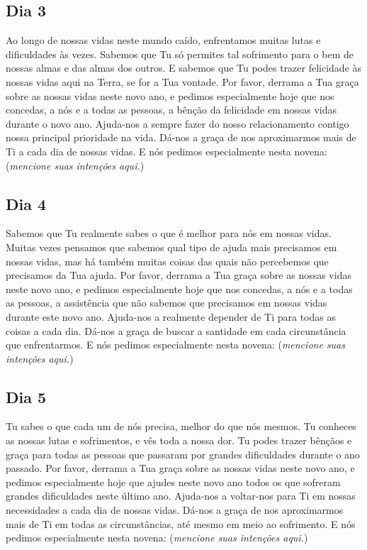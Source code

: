 \documentclass[a4paper,14pt]{extarticle} \usepackage[utf8]{inputenc}
\begin{document}
\subsection{Dia 3}

Ao longo de nossas vidas neste mundo caído, enfrentamos muitas lutas e dificuldades às vezes. Sabemos que Tu só permites tal sofrimento para o bem de nossas almas e das almas dos outros. E sabemos que Tu podes trazer felicidade às nossas vidas aqui na Terra, se for a Tua vontade.
Por favor, derrama a Tua graça sobre as nossas vidas neste novo ano, e pedimos especialmente hoje que nos concedas, a nós e a todas as pessoas, a bênção da felicidade em nossas vidas durante o novo ano.
Ajuda-nos a sempre fazer do nosso relacionamento contigo nossa principal prioridade na vida. Dá-nos a graça de nos aproximarmos mais de Ti a cada dia de nossas vidas.
E nós pedimos especialmente nesta novena: (\textit{mencione suas intenções aqui.})

\subsection{Dia 4}

Sabemos que Tu realmente sabes o que é melhor para nós em nossas vidas. Muitas vezes pensamos que sabemos qual tipo de ajuda mais precisamos em nossas vidas, mas há também muitas coisas das quais não percebemos que precisamos da Tua ajuda.
Por favor, derrama a Tua graça sobre as nossas vidas neste novo ano, e pedimos especialmente hoje que nos concedas, a nós e a todas as pessoas, a assistência que não sabemos que precisamos em nossas vidas durante este novo ano.
Ajuda-nos a realmente depender de Ti para todas as coisas a cada dia. Dá-nos a graça de buscar a santidade em cada circunstância que enfrentarmos.
E nós pedimos especialmente nesta novena: (\textit{mencione suas intenções aqui.})

\subsection{Dia 5}

Tu sabes o que cada um de nós precisa, melhor do que nós mesmos. Tu conheces as nossas lutas e sofrimentos, e vês toda a nossa dor. Tu podes trazer bênçãos e graça para todas as pessoas que passaram por grandes dificuldades durante o ano passado.
Por favor, derrama a Tua graça sobre as nossas vidas neste novo ano, e pedimos especialmente hoje que ajudes neste novo ano todos os que sofreram grandes dificuldades neste último ano.
Ajuda-nos a voltar-nos para Ti em nossas necessidades a cada dia de nossas vidas. Dá-nos a graça de nos aproximarmos mais de Ti em todas as circunstâncias, até mesmo em meio ao sofrimento.
E nós pedimos especialmente nesta novena: (\textit{mencione suas intenções aqui.})
\end{document}
